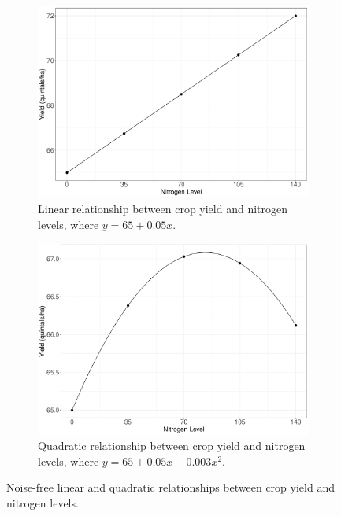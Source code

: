 \documentclass[a4paper]{article} 	%
\begin{document}
\begin{figure}[!htp]
	\begin{subfigure}[t]{0.45\textwidth}
		\centering
		\includegraphics[width=\linewidth]{LinlinesV2.pdf}
		\caption{Linear relationship between crop yield and nitrogen levels, where $y=65+0.05x$.}
	\end{subfigure}
	\hspace{0.05\textwidth}
	\begin{subfigure}[t]{0.45\textwidth}
		\centering
		\includegraphics[width=\linewidth]{QualinesV2.pdf}
		\caption{Quadratic relationship between crop yield and nitrogen levels, where $y=65+0.05x-0.003x^2$.}
	\end{subfigure}
	\caption{Noise-free linear and quadratic relationships between crop yield and nitrogen levels.}\label{fig:Lines}
\end{figure}
\end{document}
